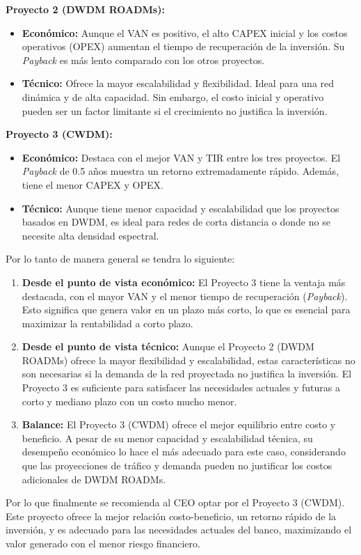 \begin{itemize}
\textbf{Proyecto 2 (DWDM ROADMs):}
\begin{itemize}
    \item \textbf{Económico:} Aunque el VAN es positivo, el alto CAPEX inicial y los costos operativos (OPEX) aumentan el tiempo de recuperación de la inversión. Su \textit{Payback} es más lento comparado con los otros proyectos.
    \item \textbf{Técnico:} Ofrece la mayor escalabilidad y flexibilidad. Ideal para una red dinámica y de alta capacidad. Sin embargo, el costo inicial y operativo pueden ser un factor limitante si el crecimiento no justifica la inversión.
\end{itemize}

\textbf{Proyecto 3 (CWDM):}
\begin{itemize}
    \item \textbf{Económico:} Destaca con el mejor VAN y TIR entre los tres proyectos. El \textit{Payback} de 0.5 años muestra un retorno extremadamente rápido. Además, tiene el menor CAPEX y OPEX.
    \item \textbf{Técnico:} Aunque tiene menor capacidad y escalabilidad que los proyectos basados en DWDM, es ideal para redes de corta distancia o donde no se necesite alta densidad espectral.
\end{itemize}
Por lo tanto de manera general se tendra lo siguiente:
\begin{enumerate}
    \item \textbf{Desde el punto de vista económico:} El Proyecto 3 tiene la ventaja más destacada, con el mayor VAN y el menor tiempo de recuperación (\textit{Payback}). Esto significa que genera valor en un plazo más corto, lo que es esencial para maximizar la rentabilidad a corto plazo.
    
    \item \textbf{Desde el punto de vista técnico:} Aunque el Proyecto 2 (DWDM ROADMs) ofrece la mayor flexibilidad y escalabilidad, estas características no son necesarias si la demanda de la red proyectada no justifica la inversión. El Proyecto 3 es suficiente para satisfacer las necesidades actuales y futuras a corto y mediano plazo con un costo mucho menor.
    
    \item \textbf{Balance:} El Proyecto 3 (CWDM) ofrece el mejor equilibrio entre costo y beneficio. A pesar de su menor capacidad y escalabilidad técnica, su desempeño económico lo hace el más adecuado para este caso, considerando que las proyecciones de tráfico y demanda pueden no justificar los costos adicionales de DWDM ROADMs.
\end{enumerate}
Por lo que finalmente se recomienda al CEO optar por el Proyecto 3 (CWDM). Este proyecto ofrece la mejor relación costo-beneficio, un retorno rápido de la inversión, y es adecuado para las necesidades actuales del banco, maximizando el valor generado con el menor riesgo financiero.

\end{itemize}